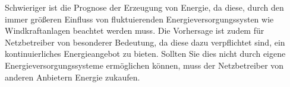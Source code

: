 Schwieriger ist die Prognose der Erzeugung von Energie, da diese, durch den
immer größeren Einfluss von fluktuierenden Energieversorgungssysten wie
Windkraftanlagen beachtet werden muss. Die Vorhersage ist zudem für
Netzbetreiber von besonderer Bedeutung, da diese dazu verpflichtet sind, ein
kontinuierliches Energieangebot zu bieten. Sollten Sie dies nicht durch eigene
Energieversorgungssysteme ermöglichen können, muss der Netzbetreiber von
anderen Anbietern Energie zukaufen. \cite{deppekunstliche}